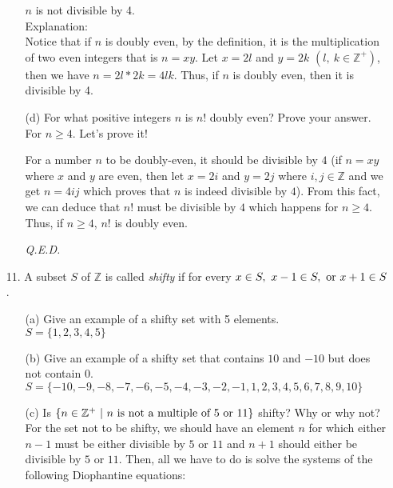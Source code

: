 \documentclass[12pt, a4paper]{article}                  %
\begin{document}
\begin{enumerate}
\begin{enumerate}
$n$ is not divisible by 4.\\

Explanation:\\
Notice that if $n$ is doubly even, by the definition, it is the multiplication
of two even integers that is $n = xy$. Let $x = 2l$ and $y = 2k$ $(l, \ k \in \mathbb{Z}^+)$, then we have
$n = 2l * 2k = 4lk$. Thus, if $n$ is doubly even, then it is divisible by 4.
\\
\item[(d)]
For what positive integers $n$ is $n!$ doubly even? Prove your answer.\\

For $n \geq 4$. Let's prove it!

For a number $n$ to be doubly-even, it should be divisible by $4$
(if $n = xy$ where $x$ and $y$ are even, then let $x = 2i$ and $y = 2j$
where $i,j \in \mathbb{Z}$ and we get $n = 4ij$ which proves that $n$ is
indeed divisible by $4$). From this fact, we can deduce that $n!$ must
be divisible by $4$ which happens for $n \geq 4$. Thus, if $n \geq 4$, $n!$
is doubly even.
\begin{flushright}
\textit{Q.E.D.}
\end{flushright}
\end{enumerate}

\item[11.]
A subset $S$ of $\mathbb{Z}$ is called \textit{shifty} if for every $x \in S, \ x - 1 \in S, \ \textnormal{or} \ x + 1 \in S$.
\begin{enumerate}
\item[(a)]
Give an example of a shifty set with 5 elements.\\

$S = \{1,2,3,4,5\}$
\\
\item[(b)]
Give an example of a shifty set that contains $10$ and $-10$ but does not contain $0$.\\

$S = \{-10,-9,-8,-7,-6,-5,-4,-3,-2,-1,1,2,3,4,5,6,7,8,9,10\}$
\\
\item[(c)]
Is $\{n \in \mathbb{Z}^+ \ \vert \ n \ \textnormal{is not a multiple of 5 or 11} \}$ shifty? Why or why not?\\

For the set not to be shifty, we should have an element $n$ for which either $n-1$
must be either divisible by $5$ or $11$ and $n + 1$ should either be divisible by $5$
or $11$. Then, all we have to do is solve the systems of the following Diophantine equations:


\end{enumerate}
\end{enumerate}
\end{document}
